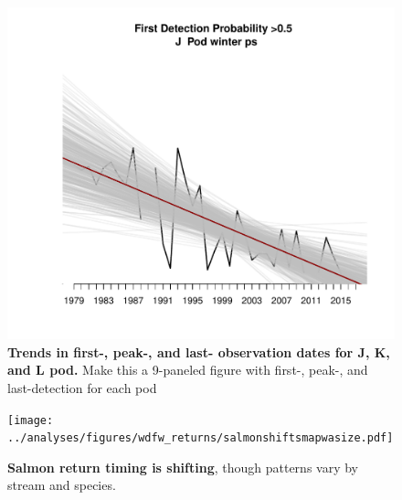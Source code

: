 \documentclass{article}
\begin{document}
 
\begin{figure}[p]
\includegraphics{../analyses/figures/J/orcaphen_1976_2017_PS_winter_Jfirst.pdf} 
\caption{\textbf{Trends in first-, peak-, and last- observation dates for J, K, and L pod.} Make this a 9-paneled figure with first-, peak-, and last-detection for each pod}
 \label{fig:occupancy}
 \end{figure}

\begin{figure}[p]
\texttt{[image: ../analyses/figures/wdfw\_returns/salmonshiftsmapwasize.pdf]} 
\caption{\textbf{Salmon return timing is shifting}, though patterns vary by stream and species.}
 \label{fig:salmon}
 \end{figure}


\end{document}
